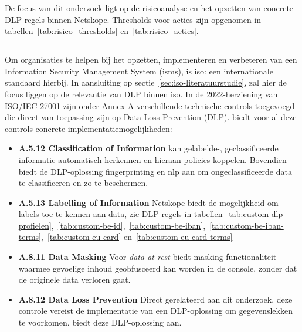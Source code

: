 De focus van dit onderzoek ligt op de risicoanalyse en het opzetten van concrete DLP-regels binnen Netskope. Thresholds voor acties zijn opgenomen in tabellen~\ref{tab:risico_thresholds} en~\ref{tab:risico_acties}.

\subsection{}
\label{sec:iso_27001}

Om organisaties te helpen bij het opzetten, implementeren en verbeteren van een Information Security Management System (\gls{isms}),
is \gls{iso}:\autocite{ISO2022} een internationale standaard hierbij.
In aansluiting op sectie~\ref{sec:iso-literatuurstudie}, zal hier de focus liggen op de relevantie van DLP binnen \gls{iso}.
In de 2022-herziening van ISO/IEC 27001 zijn onder Annex A verschillende technische controls toegevoegd die direct van toepassing zijn op Data Loss Prevention (DLP).  
\textcite{Netskope2024ISO} biedt voor al deze controls concrete implementatiemogelijkheden:

\begin{itemize}
  \item \textbf{A.5.12 Classification of Information}  
    \textcite{Netskope2023AI, NetskopeCatDef2025, Netskope2025CreateProfiles} kan gelabelde-, geclassificeerde informatie automatisch herkennen en hieraan policies koppelen. 
    Bovendien biedt de DLP-oplossing fingerprinting en \gls{nlp} aan om ongeclassificeerde data te classificeren en zo te beschermen. 

  \item \textbf{A.5.13 Labelling of Information}  
    Netskope biedt de mogelijkheid om labels toe te kennen aan data, zie DLP-regels in tabellen~\ref{tab:custom-dlp-profielen},~\ref{tab:custom-be-id},~\ref{tab:custom-be-iban},~\ref{tab:custom-be-iban-terms},~\ref{tab:custom-eu-card} en~\ref{tab:custom-eu-card-terms}

  \item \textbf{A.8.11 Data Masking}  
    Voor \textit{data-at-rest} biedt \textcite{Netskope2022Encryption, Netskope2025Encryption} masking-functionaliteit waarmee gevoelige inhoud geobfusceerd kan worden in de console,
    zonder dat de originele data verloren gaat.

  \item \textbf{A.8.12 Data Loss Prevention}  
    Direct gerelateerd aan dit onderzoek, deze controle vereist de implementatie van een DLP-oplossing om gegevenslekken te voorkomen.
    \textcite{Netskope2025DLP} biedt deze DLP-oplossing aan.
\end{itemize}

